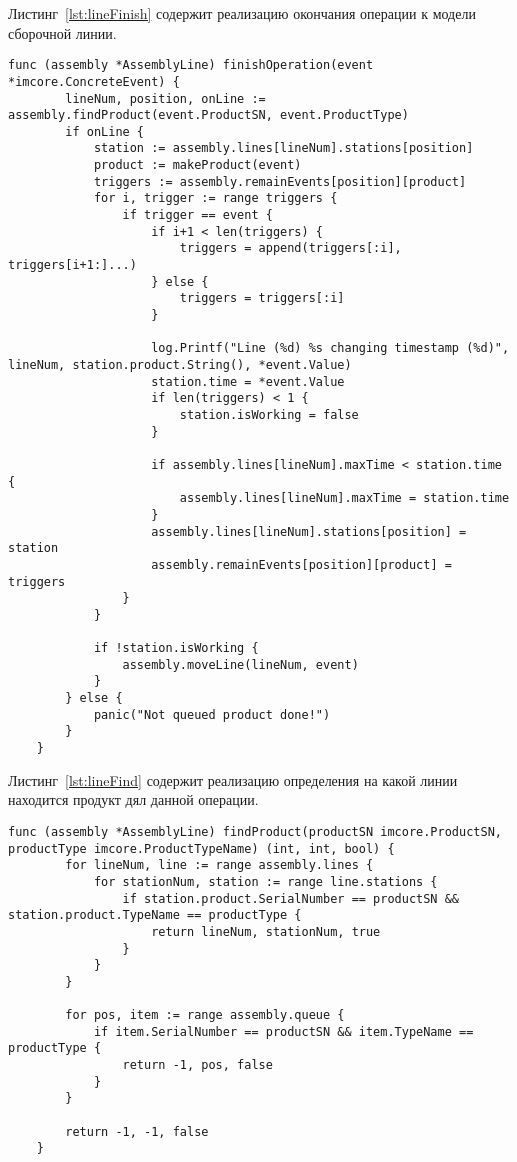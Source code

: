 Листинг~\ref{lst:lineFinish} содержит реализацию окончания операции к модели сборочной линии.

\begin{lstlisting}[language=Golang,caption={Метод окончания операции},label=lst:lineFinish]
	func (assembly *AssemblyLine) finishOperation(event *imcore.ConcreteEvent) {
		lineNum, position, onLine := assembly.findProduct(event.ProductSN, event.ProductType)
		if onLine {
			station := assembly.lines[lineNum].stations[position]
			product := makeProduct(event)
			triggers := assembly.remainEvents[position][product]
			for i, trigger := range triggers {
				if trigger == event {
					if i+1 < len(triggers) {
						triggers = append(triggers[:i], triggers[i+1:]...)
					} else {
						triggers = triggers[:i]
					}

					log.Printf("Line (%d) %s changing timestamp (%d)", lineNum, station.product.String(), *event.Value)
					station.time = *event.Value
					if len(triggers) < 1 {
						station.isWorking = false
					}
					
					if assembly.lines[lineNum].maxTime < station.time {
						assembly.lines[lineNum].maxTime = station.time
					}
					assembly.lines[lineNum].stations[position] = station
					assembly.remainEvents[position][product] = triggers
				}
			}
			
			if !station.isWorking {
				assembly.moveLine(lineNum, event)
			}
		} else {
			panic("Not queued product done!")
		}
	}
\end{lstlisting}

Листинг~\ref{lst:lineFind} содержит реализацию определения на какой линии находится продукт дял данной операции.

\begin{lstlisting}[language=Golang,caption={Метод, производящий определение линии по заданной продукции},label=lst:lineFind]
	func (assembly *AssemblyLine) findProduct(productSN imcore.ProductSN, productType imcore.ProductTypeName) (int, int, bool) {
		for lineNum, line := range assembly.lines {
			for stationNum, station := range line.stations {
				if station.product.SerialNumber == productSN && station.product.TypeName == productType {
					return lineNum, stationNum, true
				}
			}
		}

		for pos, item := range assembly.queue {
			if item.SerialNumber == productSN && item.TypeName == productType {
				return -1, pos, false
			}
		}

		return -1, -1, false
	}
\end{lstlisting}

